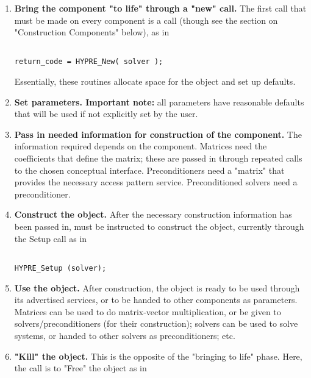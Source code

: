 \begin{enumerate}
\item
{\bf Bring the component "to life" through a "new" call.} The first call that must
be made on every 
\hypre{} component is a  call (though see the section on "Construction
Components" below), as 
in 

\begin{display}
\begin{verbatim}

return_code = HYPRE_New( solver );

\end{verbatim}
\end{display}

Essentially, these routines allocate
space for the object and 
set up defaults.

\item
{\bf Set parameters.  Important note:} all parameters have reasonable defaults
that will be used if not 
explicitly set by the user.

\item
{\bf Pass in needed information for construction of the component.} The
information required depends 
on the component. Matrices need the coefficients that define the matrix; these
are passed in through 
repeated calls to the chosen conceptual interface. Preconditioners need a
"matrix" that provides the 
necessary access pattern service. Preconditioned solvers need a preconditioner.

\item
{\bf Construct the object.} After the necessary construction information has been
passed in, \hypre{} must 
be instructed to construct the object, currently through the Setup call as in

\begin{display}
\begin{verbatim}

HYPRE_Setup (solver);

\end{verbatim}
\end{display}

\item
{\bf Use the object.} After construction, the object is ready to be used through
its advertised services, or to 
be handed to other components as parameters. Matrices can be used to do
matrix-vector multiplication, 
or be given to solvers/preconditioners (for their construction); solvers can be
used to solve systems, or 
handed to other solvers as preconditioners; etc.

\item
{\bf "Kill" the object.} This is the opposite of the "bringing to life" phase.
Here, the call is to "Free" the 
object as in 


\end{enumerate}
